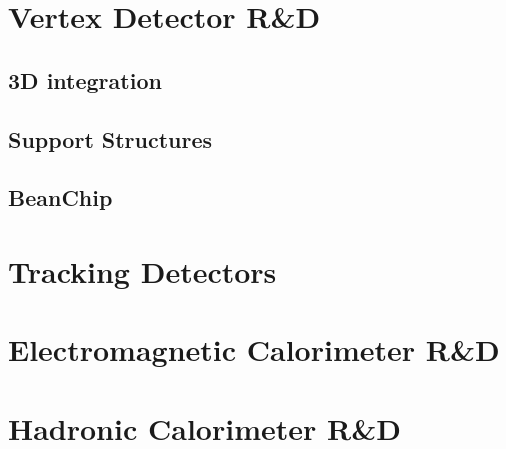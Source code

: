 \documentclass[10pt]{article}
\begin{document}
\section{Vertex Detector R\&D}


\subsection{3D integration}



\subsection{Support Structures}
\subsection{BeanChip}

\section{Tracking Detectors}



\section{Electromagnetic Calorimeter R\&D}


\section{Hadronic Calorimeter R\&D}




\end{document}
